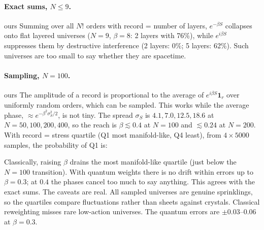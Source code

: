 \documentclass[11pt,a4paper]{article}
\newcommand{\tagbox}[2]{\textsf{\scriptsize\colorbox{#1!12}{\textcolor{#1!70!black}{#2}}}}
\newcommand{\ours}{\tagbox{orange}{ours}}
\begin{document}
\paragraph{Exact sums, $N\le9$.} \ours{} Summing over all $N!$ orders with record = number of layers, $e^{-\beta S}$ collapses onto flat layered universes ($N=9$, $\beta=8$: 2 layers with 76\%), while $e^{i\beta S}$ suppresses them by destructive interference (2 layers: 0\%; 5 layers: 62\%). Such universes are too small to say whether they are spacetime.

\paragraph{Sampling, $N=100$.} \ours{} The amplitude of a record is proportional to the average of $e^{i\beta S}\mathbf 1_r$ over uniformly random orders, which can be sampled. This works while the average phase, $\approx e^{-\beta^2\sigma_S^2/2}$, is not tiny. The spread $\sigma_S$ is $4.1,7.0,12.5,18.6$ at $N=50,100,200,400$, so the reach is $\beta\lesssim0.4$ at $N=100$ and $\lesssim0.24$ at $N=200$. With record = stress quartile (Q1 most manifold-like, Q4 least), from $4\times5000$ samples, the probability of Q1 is:
\begin{center}
\end{center}
Classically, raising $\beta$ drains the most manifold-like quartile (just below the $N=100$ transition). With quantum weights there is no drift within errors up to $\beta=0.3$; at $0.4$ the phases cancel too much to say anything. This agrees with the exact sums. The caveats are real. All sampled universes are genuine sprinklings, so the quartiles compare fluctuations rather than sheets against crystals. Classical reweighting misses rare low-action universes. The quantum errors are $\pm0.03$--$0.06$ at $\beta=0.3$.
\end{document}
